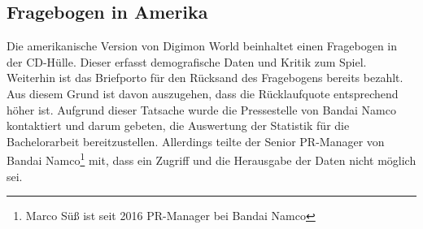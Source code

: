 \subsection{Fragebogen in Amerika}
Die amerikanische Version von Digimon World beinhaltet einen Fragebogen in der CD-Hülle. Dieser erfasst demografische Daten und Kritik zum Spiel. Weiterhin ist das Briefporto für den Rücksand des Fragebogens bereits bezahlt. Aus diesem Grund ist davon auszugehen, dass die Rücklaufquote entsprechend höher ist. Aufgrund dieser Tatsache wurde die Pressestelle von Bandai Namco kontaktiert und darum gebeten, die Auswertung der Statistik für die Bachelorarbeit bereitzustellen. Allerdings teilte der Senior PR-Manager von Bandai Namco\footnote{Marco Süß ist seit 2016 PR-Manager bei Bandai Namco\cite{marcosuess}} mit, dass ein Zugriff und die Herausgabe der Daten nicht möglich sei.

